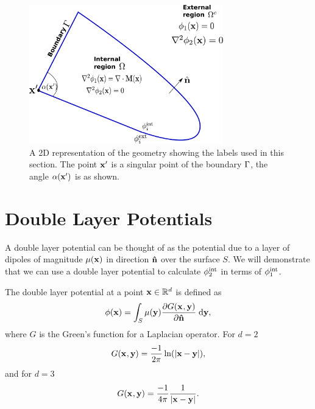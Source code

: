 \begin{figure}
  \center
  \includegraphics[width=0.75\textwidth]{./images/BEM-geometry}




  \caption{A 2D representation of the geometry showing the labels used in this section. The point $\mathbf{x}'$ is a singular point of the boundary ${\Gamma}$, the angle $\alpha(\mathbf{x}')$ is as shown.}
  \label{fig:BEM-geometry}
\end{figure}

\section{Double Layer Potentials}
\label{sec:double-layer-potent}
A double layer potential can be thought of as the potential due to a layer of dipoles of magnitude $\mu(\mathbf{x})$ in direction $\mathbf{\hat{n}}$ over the surface $S$.\cite{Sternberg1946} We will demonstrate that we can use a double layer potential to calculate $\phi^{\text{int}}_2$ in terms of $\phi^{\text{int}}_1$.

The double layer potential at a point $\mathbf{x} \in \mathbb{R}^d$ is defined as \cite{eom_double_layer_potential}
\begin{equation}
  \label{eq:3}
  \phi(\mathbf{x}) = \int_{S} \mu(\mathbf{y}) \frac{\partial G(\mathbf{x}_{},\mathbf{y})}{\partial \mathbf{\hat{n}}} {\; \text{d}} \mathbf{y},
\end{equation}
where $G$ is the Green's function for a Laplacian operator.
For $d=2$
\[ G(\mathbf{x}_{},\mathbf{y}) = \dfrac{-1}{2\pi}\ln(\lvert \mathbf{x} - \mathbf{y} \rvert), \]
and for $d=3$
\begin{equation} G(\mathbf{x}_{},\mathbf{y}) = \dfrac{-1}{4 \pi} \dfrac{1}{\lvert \mathbf{x} - \mathbf{y} \rvert}.
  \label{eqn:greenslaplacian3d}
\end{equation}


